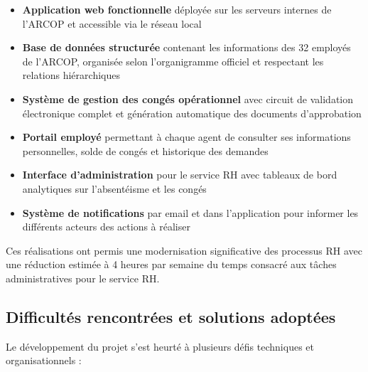 \begin{itemize}
    \item \textbf{Application web fonctionnelle} déployée sur les serveurs internes de l'ARCOP et accessible via le réseau local
    
    \item \textbf{Base de données structurée} contenant les informations des 32 employés de l'ARCOP, organisée selon l'organigramme officiel et respectant les relations hiérarchiques
    
    \item \textbf{Système de gestion des congés opérationnel} avec circuit de validation électronique complet et génération automatique des documents d'approbation
    
    \item \textbf{Portail employé} permettant à chaque agent de consulter ses informations personnelles, solde de congés et historique des demandes
    
    \item \textbf{Interface d'administration} pour le service RH avec tableaux de bord analytiques sur l'absentéisme et les congés
    
    \item \textbf{Système de notifications} par email et dans l'application pour informer les différents acteurs des actions à réaliser
\end{itemize}

Ces réalisations ont permis une modernisation significative des processus RH avec une réduction estimée à 4 heures par semaine du temps consacré aux tâches administratives pour le service RH.

\subsection{Difficultés rencontrées et solutions adoptées}
Le développement du projet s'est heurté à plusieurs défis techniques et organisationnels :

